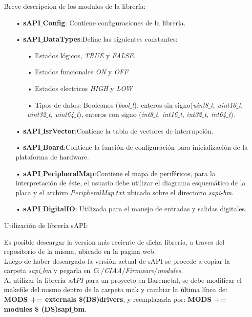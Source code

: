 \documentclass[12pt,letterpaper]{article}
\begin{document}
Breve descripcion de los modulos de la librería:
\begin{enumerate}
\item[•]\textbf{sAPI$\_$Config}: Contiene configuraciones de la librería.
\item[•]\textbf{sAPI$\_$DataTypes}:Define las siguientes constantes:
\begin{enumerate}
\item[•]Estados lógicos, \textit{TRUE} y \textit{FALSE}.
\item[•]Estados funcionales \textit{ON} y \textit{OFF}
\item[•]Estados electricos \textit{HIGH} y \textit{LOW}
\item[•]Tipos de datos: Booleanos (\textit{bool$\_$t}), enteros sin signo(\textit{uint8$\_$t, uint16$\_$t, uint32$\_$t, uint64$\_$t}), enteros con signo (\textit{int8$\_$t, int16$\_$t, int32$\_$t, int64$\_$t}).
\end{enumerate}
\item[•]\textbf{sAPI$\_$IsrVector}:Contiene la tabla de vectores de interrupción.
\item[•]\textbf{sAPI$\_$Board}:Contiene la función de configuración para inicialización de la plataforma de hardware.
\item[•]\textbf{sAPI$\_$PeripheralMap}:Contiene el mapa de periféricos, para la interpretación de éste, el usuario debe utilizar el diagrama esquemático de la placa y el archivo \textit{PeripheralMap$.txt$} ubicado sobre el directorio \textit{sapi-bm}.
\item[•]\textbf{sAPI$\_$DigitalIO}: Utilizada para el manejo de entradas y salidas digitales.
\end{enumerate}


Utilización de librería sAPI:

Es posible descargar la version más reciente de dicha librería, a traves del repositorio de la misma, ubicado en la pagina web.
 \\
 
Luego de haber descargado la versión actual de  sAPI se procede a copiar la carpeta \textit{sapi$\_$bm} y pegarla en \textit{C$:/$CIAA$/$Firmware$/$modules}.
 \\
 
Al utilizar la librería \textit{sAPI} para un proyecto en Baremetal, se debe modificar el makefile del mismo dentro de la carpeta mak y cambiar la última línea de: \textbf{MODS += externals \$(DS)drivers}, y reemplazarla por:  \textbf{MODS += modules \$ (DS)sapi$\_$bm}.
 \\
 
\end{document}
